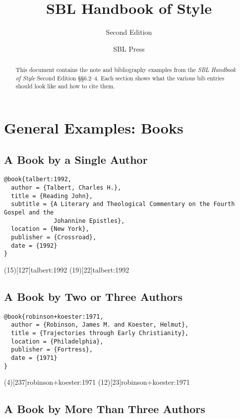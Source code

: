 \documentclass[a4paper]{article}
\begin{document}
\title{SBL Handbook of Style}
\author{Second Edition}
\date{SBL Press}
\maketitle

\begin{abstract}
  This document contains the note and bibliography examples from the \emph{SBL
  Handbook of Style} Second Edition §§6.2–4. Each section shows what the
  various bib entries should look like and how to cite them.
\end{abstract}

\tableofcontents

\section{General Examples: Books}

\subsection{A Book by a Single Author}

\begin{verbatim}
@book{talbert:1992,
  author = {Talbert, Charles H.},
  title = {Reading John},
  subtitle = {A Literary and Theological Commentary on the Fourth Gospel and the
              Johannine Epistles},
  location = {New York},
  publisher = {Crossroad},
  date = {1992}
}
\end{verbatim}

\examplecite(15)[127]{talbert:1992}
\examplecite(19)[22]{talbert:1992}
\examplebibliography

\subsection{A Book by Two or Three Authors}

\begin{verbatim}
@book{robinson+koester:1971,
  author = {Robinson, James M. and Koester, Helmut},
  title = {Trajectories through Early Christianity},
  location = {Philadelphia},
  publisher = {Fortress},
  date = {1971}
}
\end{verbatim}

\examplecite(4)[237]{robinson+koester:1971}
\examplecite(12)[23]{robinson+koester:1971}
\examplebibliography

\subsection{A Book by More Than Three Authors}
\end{document}
